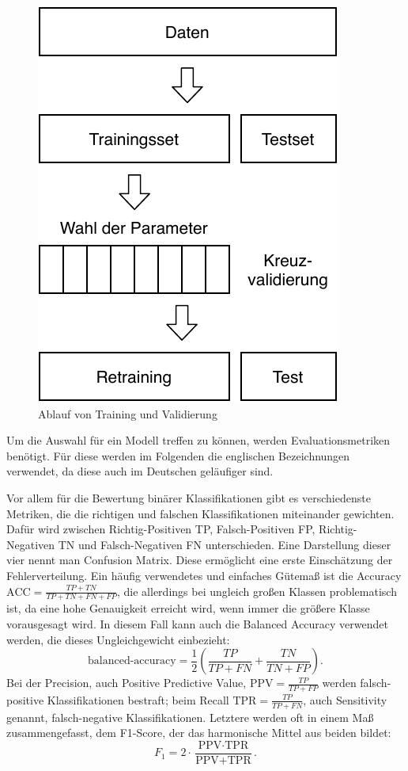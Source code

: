 	\begin{figure}[H]
		\centering
		\includegraphics[scale=1]{pic/validation-ablauf.pdf}
		\caption{Ablauf von Training und Validierung}
		\label{fig:validation-ablauf}
	\end{figure}
	
	Um die Auswahl für ein Modell treffen zu können, werden Evaluationsmetriken benötigt. Für diese werden im Folgenden die englischen Bezeichnungen verwendet, da diese auch im Deutschen geläufiger sind.
	
	Vor allem für die Bewertung binärer Klassifikationen gibt es verschiedenste Metriken, die die richtigen und falschen Klassifikationen miteinander gewichten. Dafür wird zwischen Richtig-Positiven TP, Falsch-Positiven FP, Richtig-Negativen TN und Falsch-Negativen FN unterschieden. Eine Darstellung dieser vier nennt man Confusion Matrix. Diese ermöglicht eine erste Einschätzung der Fehlerverteilung. Ein häufig verwendetes und einfaches Gütemaß ist die Accuracy $\text{ACC} = \frac{TP + TN}{TP + TN + FN + FP}$, die allerdings bei ungleich großen Klassen problematisch ist, da eine hohe Genauigkeit erreicht wird, wenn immer die größere Klasse vorausgesagt wird. In diesem Fall kann auch die Balanced Accuracy verwendet werden, die dieses Ungleichgewicht einbezieht:
	\[
		\text{balanced-accuracy} = \frac{1}{2}\left( \frac{TP}{TP + FN} + \frac{TN}{TN + FP}\right).
	\]
	 Bei der Precision, auch Positive Predictive Value, $\text{PPV} = \frac{TP}{TP + FP}$ werden falsch-positive Klassifikationen \glqq bestraft\grqq{}; beim Recall $\text{TPR} = \frac{TP}{TP + FN}$, auch Sensitivity genannt, falsch-negative Klassifikationen. Letztere werden oft in einem Maß zusammengefasst, dem F1-Score, der das harmonische Mittel aus beiden bildet:
	\[
		F_1 = 2 \cdot \frac{\text{PPV} \cdot \text{TPR}}{\text{PPV} + \text{TPR}}.
	\]
	
